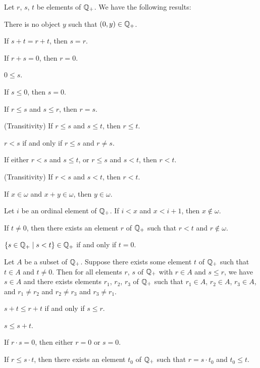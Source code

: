 \documentclass{article}
\begin{document}
Let $r$, $s$, $t$ be elements of $\mathbb{Q}_{+}$. We have the following results:
\begin{thm}
\item\label{arytm3:61} There is no object $y$ such that $(0,y)\in\mathbb{Q}_{+}$.
\item\label{arytm3:62} If $s+t=r+t$, then $s=r$.
\item\label{arytm3:63} If $r+s=0$, then $r=0$.
\item\label{arytm3:64} $0\leq s$.
\item\label{arytm3:65} If $s\leq0$, then $s=0$.
\item\label{arytm3:66} If $r\leq s$ and $s\leq r$, then $r=s$.
\item\label{arytm3:67} (Transitivity) If $r\leq s$ and $s\leq t$, then
  $r\leq t$.
\item\label{arytm3:68} $r<s$ if and only if $r\leq s$ and $r\neq s$.
\item\label{arytm3:69} If either $r<s$ and $s\leq t$, or $r\leq s$ and $s<t$,
  then $r<t$.
\item\label{arytm3:70} (Transitivity) If $r<s$ and $s<t$, then $r<t$.
\item\label{arytm3:71} If $x\in\omega$ and $x+y\in\omega$, then $y\in\omega$.
\item\label{arytm3:72} Let $i$ be an ordinal element of $\mathbb{Q}_{+}$.
  If $i<x$ and $x<i+1$, then $x\notin\omega$.
\item\label{arytm3:73} If $t\neq0$, then there exists an element $r$ of
  $\mathbb{Q}_{+}$ such that $r < t$ and $r\notin\omega$.
\item\label{arytm3:74} $\{s\in\mathbb{Q}_{+}\mid s<t\}\in\mathbb{Q}_{+}$ if and only
  if $t=0$.
\item\label{arytm3:75} Let $A$ be a subset of $\mathbb{Q}_{+}$.
  Suppose there exists some element $t$ of $\mathbb{Q}_{+}$ such that $t\in A$
  and $t\neq0$.
  Then for all elements $r$, $s$ of $\mathbb{Q}_{+}$ with $r\in A$ and $s\leq r$,
  we have $s\in A$ and there exists elements $r_{1}$, $r_{2}$, $r_{3}$
  of $\mathbb{Q}_{+}$ such that $r_{1}\in A$, $r_{2}\in A$, $r_{3}\in A$, and
  $r_{1}\neq r_{2}$ and $r_{2}\neq r_{3}$ and $r_{3}\neq r_{1}$.
\item\label{arytm3:76} $s+t\leq r+t$ if and only if $s\leq r$.
\item\label{arytm3:77} $s\leq s+t$.
\item\label{arytm3:78} If $r\cdot s=0$, then either $r=0$ or $s=0$.
\item\label{arytm3:79} If $r\leq s\cdot t$, then there exists an element
  $t_{0}$ of $\mathbb{Q}_{+}$ such that $r=s\cdot t_{0}$ and $t_{0}\leq t$.

\end{thm}
\end{document}

